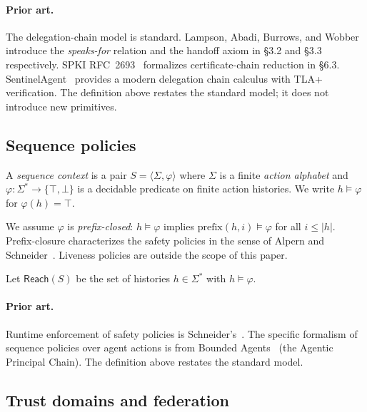 \documentclass[11pt,a4paper]{article}
\theoremstyle{plain}
\theoremstyle{definition}
\theoremstyle{remark}
\begin{document}
\paragraph{Prior art.} The delegation-chain model is standard. Lampson, Abadi,
Burrows, and Wobber~\cite{lampson1992authentication} introduce the
\emph{speaks-for} relation and the handoff axiom in \S3.2 and \S3.3
respectively. SPKI RFC~2693~\cite{rfc2693spki} formalizes certificate-chain
reduction in \S6.3. SentinelAgent~\cite{sentinelagent2026} provides a modern
delegation chain calculus with TLA+ verification. The definition above restates
the standard model; it does not introduce new primitives.

\subsection{Sequence policies}

A \emph{sequence context} is a pair $S = \langle \Sigma, \varphi \rangle$
where $\Sigma$ is a finite \emph{action alphabet} and $\varphi : \Sigma^* \to
\{\top, \bot\}$ is a decidable predicate on finite action histories. We write
$h \models \varphi$ for $\varphi(h) = \top$.

We assume $\varphi$ is \emph{prefix-closed}: $h \models \varphi$ implies
$\mathrm{prefix}(h, i) \models \varphi$ for all $i \le |h|$. Prefix-closure
characterizes the safety policies in the sense of
Alpern and Schneider~\cite{alpern1985defining}. Liveness policies are outside
the scope of this paper.

Let $\mathsf{Reach}(S)$ be the set of histories $h \in \Sigma^*$ with $h
\models \varphi$.

\paragraph{Prior art.} Runtime enforcement of safety policies is
Schneider's~\cite{schneider2000enforceable}. The specific formalism of
sequence policies over agent actions is from Bounded
Agents~\cite{boundedagents2026} (the Agentic Principal Chain). The definition
above restates the standard model.

\subsection{Trust domains and federation}
\end{document}
